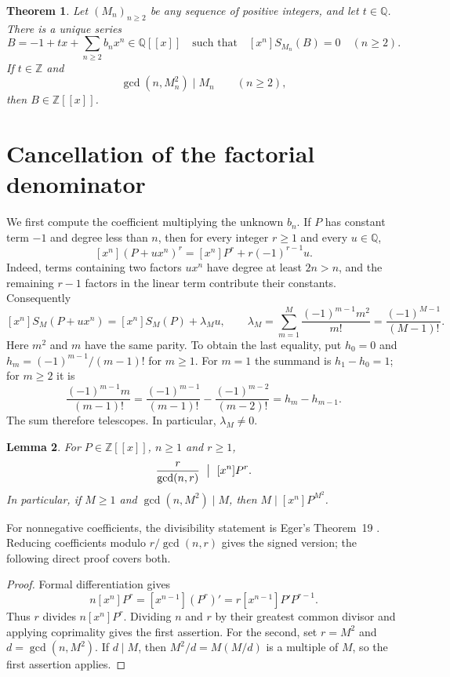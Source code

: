 \documentclass[11pt]{article}
\newtheorem{theorem}{Theorem}
\newtheorem{lemma}[theorem]{Lemma}
\newcommand{\Q}{\mathbb{Q}}
\newcommand{\Z}{\mathbb{Z}}
\begin{document}
\begin{theorem}\label{thm:main}
Let $(M_n)_{n\geq2}$ be any sequence of positive integers, and let $t\in\Q$.
There is a unique series
\[
 B=-1+tx+\sum_{n\geq2}b_nx^n\in\Q[[x]]
 \quad\text{such that}\quad [x^n]S_{M_n}(B)=0\quad(n\geq2).
\]
If $t\in\Z$ and
\begin{equation}\label{eq:criterion}
 \gcd(n,M_n^2)\mid M_n\qquad(n\geq2),
\end{equation}
then $B\in\Z[[x]]$.
\end{theorem}

\section{Cancellation of the factorial denominator}
We first compute the coefficient multiplying the unknown $b_n$.
If $P$ has constant term $-1$ and degree less than $n$, then for every
integer $r\geq1$ and every $u\in\Q$,
\[
 [x^n](P+ux^n)^r=[x^n]P^r+r(-1)^{r-1}u.
\]
Indeed, terms containing two factors $ux^n$ have degree at least $2n>n$,
and the remaining $r-1$ factors in the linear term contribute their constants.
Consequently
\begin{equation}\label{eq:slope}
 [x^n]S_M(P+ux^n)=[x^n]S_M(P)+\lambda_M u,
 \qquad
 \lambda_M=\sum_{m=1}^{M}\frac{(-1)^{m-1}m^2}{m!}
          =\frac{(-1)^{M-1}}{(M-1)!}.
\end{equation}
Here $m^2$ and $m$ have the same parity. To obtain the last equality, put
$h_0=0$ and $h_m=(-1)^{m-1}/(m-1)!$ for $m\geq1$.
For $m=1$ the summand is $h_1-h_0=1$; for $m\geq2$ it is
\[
 \frac{(-1)^{m-1}m}{(m-1)!}
 =\frac{(-1)^{m-1}}{(m-1)!}
  -\frac{(-1)^{m-2}}{(m-2)!}=h_m-h_{m-1}.
\]
The sum therefore telescopes. In particular, $\lambda_M\ne0$.

\begin{lemma}\label{lem:div}
For $P\in\Z[[x]]$, $n\geq1$ and $r\geq1$,
\[
 \frac{r}{\gcd(n,r)}\ \bigm|\ [x^n]P^r.
\]
In particular, if $M\geq1$ and $\gcd(n,M^2)\mid M$, then
$M\mid[x^n]P^{M^2}$.
\end{lemma}
For nonnegative coefficients, the divisibility statement is Eger's
Theorem~19 \cite{eger}. Reducing coefficients modulo $r/\gcd(n,r)$ gives
the signed version; the following direct proof covers both.
\begin{proof}
Formal differentiation gives
\[
 n[x^n]P^r=[x^{n-1}](P^r)'=r[x^{n-1}]P'P^{r-1}.
\]
Thus $r$ divides $n[x^n]P^r$. Dividing $n$ and $r$ by their greatest common
divisor and applying coprimality gives the first assertion.
For the second, set $r=M^2$ and $d=\gcd(n,M^2)$. If $d\mid M$, then
$M^2/d=M(M/d)$ is a multiple of $M$, so the first assertion applies.
\end{proof}
\end{document}
